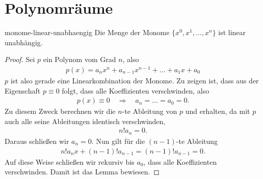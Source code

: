 \section{Polynomräume}





\begin{Lemma}{monome-linear-unabhaengig}
  Die Menge der Monome $\{x^0, x^1,\dots,x^n\}$ ist linear unabhängig.
\end{Lemma}

\begin{proof}
  Sei $p$ ein Polynom vom Grad $n$, also
  \begin{gather}
     p(x) = a_nx^n+a_{n-1}x^{n-1}+\dots+a_1x+a_0
   \end{gather}
   $p$ ist also gerade eine Linearkombination der Monome.  Zu zeigen
   ist, dass aus der Eigenschaft $p \equiv 0$ folgt, dass alle
   Koeffizienten verschwinden, also
  \begin{gather}
    p(x) \equiv 0
    \quad\Rightarrow\quad a_n = \dots = a_0 = 0.
  \end{gather}
  Zu diesem Zweck berechnen wir die $n$-te Ableitung von $p$ und
  erhalten, da mit $p$ auch alle seine Ableitungen identisch
  verschwinden,
  \begin{gather}
    n! a_n = 0.
  \end{gather}
  Daraus schließen wir $a_n = 0$. Nun gilt für die $(n-1)$-te Ableitung
  \begin{gather}
    n! a_n x + (n-1)! a_{n-1} = (n-1)! a_{n-1} = 0.
  \end{gather}
  Auf diese Weise schließen wir rekursiv bis $a_0$, dass alle Koeffizienten verschwinden. Damit ist das Lemma bewiesen.
\end{proof}

